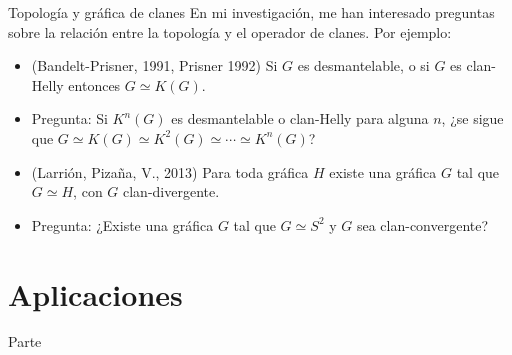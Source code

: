 \documentclass[spanish, presentation, aspectratio=169]{beamer}
\begin{document}
\begin{frame}[label={sec:org559277f}]{Topología y gráfica de clanes}
En mi investigación, me han interesado preguntas sobre la relación entre la topología y el operador de clanes. Por ejemplo:

\begin{itemize}
\item (Bandelt-Prisner, 1991, Prisner 1992) Si \(G\) es desmantelable, o si \(G\) es clan-Helly entonces \(G\simeq K(G)\).
\item \alert{Pregunta:} Si \(K^{n}(G)\) es desmantelable o clan-Helly para alguna \(n\), ¿se sigue que \(G\simeq K(G)\simeq K^{2}(G)\simeq\cdots\simeq K^{n}(G)\)?
\item (Larrión, Pizaña, V., 2013) Para toda gráfica \(H\) existe una gráfica \(G\) tal que \(G\simeq H\), con \(G\) clan-divergente.
\item \alert{Pregunta:} ¿Existe una gráfica \(G\) tal que \(G\simeq S^{2}\) y \(G\) sea clan-convergente?
\end{itemize}
\end{frame}

\section{Aplicaciones}
\label{sec:org80cc6b2}

\begin{frame}[label={sec:org7d39008},plain]{Parte}

\renewcommand*\sfdefault{ugq}
\sffamily\bfseries
{}
\end{frame}
\end{document}
